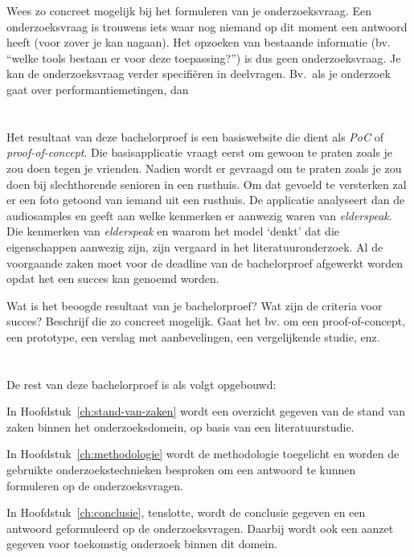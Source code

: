 \color{blue}
Wees zo concreet mogelijk bij het formuleren van je onderzoeksvraag. Een onderzoeksvraag is trouwens iets waar nog niemand op dit moment een antwoord heeft (voor zover je kan nagaan). Het opzoeken van bestaande informatie (bv. ``welke tools bestaan er voor deze toepassing?'') is dus geen onderzoeksvraag. Je kan de onderzoeksvraag verder specifiëren in deelvragen. Bv.~als je onderzoek gaat over performantiemetingen, dan
\color{black}

\section{}
\label{sec:onderzoeksdoelstelling}

Het resultaat van deze bachelorproef is een basiswebsite die dient als \textit{PoC} of \textit{proof-of-concept}. Die basisapplicatie vraagt eerst om gewoon te praten zoals je zou doen tegen je vrienden. Nadien wordt er gevraagd om te praten zoals je zou doen bij slechthorende senioren in een rusthuis. Om dat gevoeld te versterken zal er een foto getoond van iemand uit een rusthuis. De applicatie analyseert dan de audiosamples en geeft aan welke kenmerken er aanwezig waren van \textit{elderspeak}. Die kenmerken van \textit{elderspeak} en waarom het model `denkt' dat die eigenschappen aanwezig zijn, zijn vergaard in het literatuuronderzoek. Al de voorgaande zaken moet voor de deadline van de bachelorproef afgewerkt worden opdat het een succes kan genoemd worden.

\color{blue}
Wat is het beoogde resultaat van je bachelorproef? Wat zijn de criteria voor succes? Beschrijf die zo concreet mogelijk. Gaat het bv. om een proof-of-concept, een prototype, een verslag met aanbevelingen, een vergelijkende studie, enz.
\color{black}


\section{}
\label{sec:opzet-bachelorproef}


De rest van deze bachelorproef is als volgt opgebouwd:

In Hoofdstuk~\ref{ch:stand-van-zaken} wordt een overzicht gegeven van de stand van zaken binnen het onderzoeksdomein, op basis van een literatuurstudie.

In Hoofdstuk~\ref{ch:methodologie} wordt de methodologie toegelicht en worden de gebruikte onderzoekstechnieken besproken om een antwoord te kunnen formuleren op de onderzoeksvragen.


In Hoofdstuk~\ref{ch:conclusie}, tenslotte, wordt de conclusie gegeven en een antwoord geformuleerd op de onderzoeksvragen. Daarbij wordt ook een aanzet gegeven voor toekomstig onderzoek binnen dit domein.